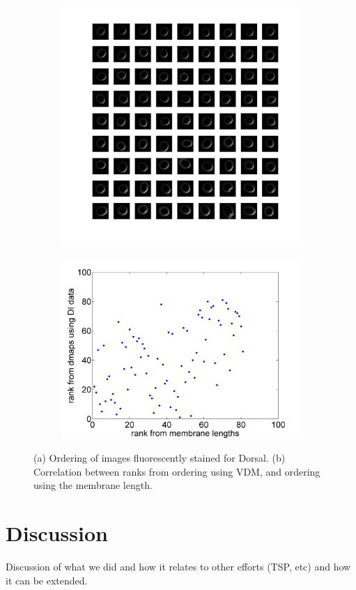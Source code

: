 \documentclass[twocolumn, 11pt]{article}
\begin{document}
\begin{figure}[h]
\begin{subfigure}[c]{0.45\textwidth}
\includegraphics[width=\textwidth]{DI_array}
\caption{}
\end{subfigure}
\begin{subfigure}[c]{0.5\textwidth}
\includegraphics[width=\textwidth]{DI_rank_corr}
\caption{}
\end{subfigure}
\caption{(a) Ordering of images fluorescently stained for Dorsal. (b) Correlation between ranks from ordering using VDM, and ordering using the membrane length.}
\label{fig:Dl}
\end{figure}

\section{Discussion}
Discussion of what we did and how it relates to other efforts (TSP, etc) and how it can be extended.




\end{document}
